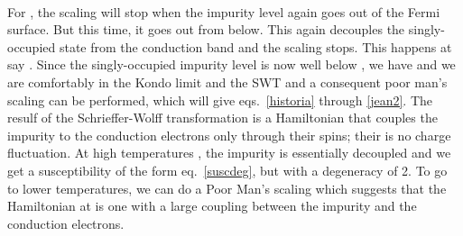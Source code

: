 \documentclass[14pt]{extarticle}
\numberwithin{equation}{section}
\begin{document}
\begin{center}
\begin{minipage}{50pt}
\\\\
\end{minipage}
\hspace*{20pt}\il{\Longrightarrow}\hspace*{20pt}
\begin{minipage}{50pt}
\\\\
\end{minipage}
\hspace*{20pt}\il{\Longrightarrow}\hspace*{20pt}
\begin{minipage}{50pt}
	\\\\
\end{minipage}
\end{center}
For , the scaling will stop when the impurity level again goes out of the Fermi surface. But this time, it goes out from below. This again decouples the singly-occupied state from the conduction band and the scaling stops. This happens at say . Since the singly-occupied impurity level is now well below , we have  and we are comfortably in the Kondo limit and the SWT and a consequent poor man's scaling can be performed, which will give eqs.~\ref{historia} through \ref{jean2}. The resulf of the Schrieffer-Wolff transformation is a Hamiltonian that couples the impurity to the conduction electrons only through their spins; their is no charge fluctuation. At high temperatures , the impurity is essentially decoupled and we get a susceptibility of the form eq.~\ref{suscdeg}, but with a degeneracy of 2. To go to lower temperatures, we can do a Poor Man's scaling which suggests that the Hamiltonian at  is one with a large coupling between the impurity and the conduction electrons.
\end{document}
